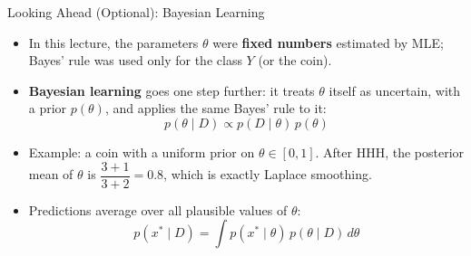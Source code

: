 \documentclass[aspectratio=169]{beamer}
\begin{document}
\appendix

\begin{frame}{Looking Ahead (Optional): Bayesian Learning}
\begin{itemize}
  \item In this lecture, the parameters $\theta$ were \textbf{fixed numbers} estimated by MLE; Bayes' rule was used only for the class $Y$ (or the coin).
  \item \textbf{Bayesian learning} goes one step further: it treats $\theta$ itself as uncertain, with a prior $p(\theta)$, and applies the same Bayes' rule to it:
  \[
    p(\theta\mid D) \propto p(D\mid\theta)\,p(\theta)
  \]
  \item Example: a coin with a uniform prior on $\theta\in[0,1]$. After HHH, the posterior mean of $\theta$ is $\dfrac{3+1}{3+2}=0.8$, which is exactly Laplace smoothing.
  \item Predictions average over all plausible values of $\theta$:
  \[
    p(x^\ast\mid D)=\int p(x^\ast\mid\theta)\,p(\theta\mid D)\,d\theta
  \]
\end{itemize}
\end{frame}
\end{document}
